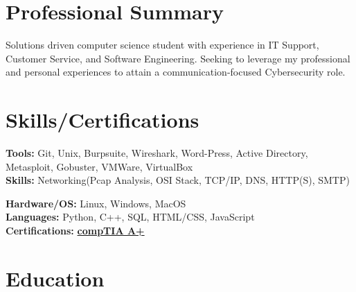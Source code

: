 \documentclass[a4paper]{Resume}
\begin{document}


\descript{}
\begin{onehalfspace} 
\section{Professional Summary}
\hrulefill

Solutions driven computer science student with experience in IT Support, Customer Service, and Software Engineering. Seeking to leverage my professional and personal experiences to attain a communication-focused Cybersecurity role.   
\sectionsep


\section{Skills/Certifications} 
\hrulefill


\pt \textbf{Tools:} Git, Unix, Burpsuite, Wireshark, Word-Press, Active Directory, Metasploit, Gobuster, VMWare, VirtualBox \\
\pt \textbf{Skills:} Networking(Pcap Analysis, OSI Stack, TCP/IP, DNS, HTTP(S), SMTP) 

\pt \textbf{Hardware/OS:}  Linux, Windows, MacOS  \\

\pt \textbf{Languages:}  Python, C++, SQL, HTML/CSS, JavaScript \\

\pt \textbf{Certifications:} \href{https://www.udemy.com/certificate/UC-98f894dc-4e81-4be3-aeb9-21b391568400/}{\textbf{compTIA A+}} \\
\sectionsep

\section{Education}
\hrulefill


\end{onehalfspace}
\end{document}
